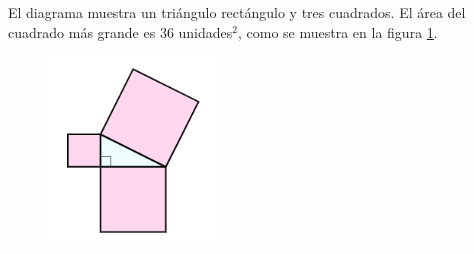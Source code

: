 \question[15] El diagrama muestra un triángulo rectángulo y tres cuadrados.
El área del cuadrado más grande es 36 unidades$^2$, como se muestra en la figura \ref{fig:area13}.
\begin{figure}[H]
    \begin{center}
        \includegraphics[width=0.4\textwidth]{../images/area13.png}
    \end{center}
    \caption{}
    \label{fig:area13}
\end{figure}

